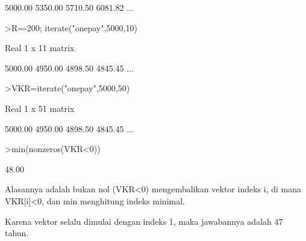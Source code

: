 \documentclass[a4paper,10pt]{article}
\begin{document}
\begin{eulernotebook}
\begin{eulercomment}
\begin{eulercomment}
\begin{eulercomment}
\begin{eulercomment}
\begin{eulercomment}
\begin{eulercomment}
\begin{eulercomment}
\begin{eulercomment}
\begin{eulercomment}
\begin{eulercomment}
\begin{eulercomment}
\begin{eulercomment}
\begin{eulercomment}
\begin{eulercomment}
\begin{eulercomment}
\begin{eulercomment}
\begin{eulercomment}
\begin{eulercomment}
\begin{eulercomment}
\begin{eulercomment}
\begin{eulercomment}
\begin{eulercomment}
\begin{eulercomment}
\begin{eulercomment}
\begin{eulercomment}
\begin{eulercomment}
\begin{eulercomment}
\begin{eulercomment}
\begin{eulercomment}
\begin{eulercomment}
\begin{eulercomment}
\begin{eulercomment}
\begin{eulercomment}
\begin{eulercomment}
\begin{euleroutput}
      5000.00     5350.00     5710.50     6081.82     ...
\end{euleroutput}
\begin{eulerprompt}
>R=-200; iterate("onepay",5000,10)
\end{eulerprompt}
\begin{euleroutput}
  Real 1 x 11 matrix
  
      5000.00     4950.00     4898.50     4845.45     ...
\end{euleroutput}
\begin{eulerprompt}
>VKR=iterate("onepay",5000,50)
\end{eulerprompt}
\begin{euleroutput}
  Real 1 x 51 matrix
  
      5000.00     4950.00     4898.50     4845.45     ...
\end{euleroutput}
\begin{eulerprompt}
>min(nonzeros(VKR<0))
\end{eulerprompt}
\begin{euleroutput}
        48.00 
\end{euleroutput}
\begin{eulercomment}
Alasannya adalah bukan nol (VKR\textless{}0) mengembalikan vektor indeks i, di
mana VKR[i]\textless{}0, dan min menghitung indeks minimal.

Karena vektor selalu dimulai dengan indeks 1, maka jawabannya adalah
47 tahun.


\end{eulercomment}
\end{eulercomment}
\end{eulercomment}
\end{eulercomment}
\end{eulercomment}
\end{eulercomment}
\end{eulercomment}
\end{eulercomment}
\end{eulercomment}
\end{eulercomment}
\end{eulercomment}
\end{eulercomment}
\end{eulercomment}
\end{eulercomment}
\end{eulercomment}
\end{eulercomment}
\end{eulercomment}
\end{eulercomment}
\end{eulercomment}
\end{eulercomment}
\end{eulercomment}
\end{eulercomment}
\end{eulercomment}
\end{eulercomment}
\end{eulercomment}
\end{eulercomment}
\end{eulercomment}
\end{eulercomment}
\end{eulercomment}
\end{eulercomment}
\end{eulercomment}
\end{eulercomment}
\end{eulercomment}
\end{eulercomment}
\end{eulercomment}
\end{eulernotebook}
\end{document}
